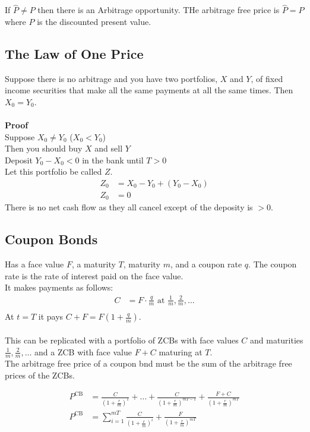 \documentclass[12pt,letterpaper, twocolumn]{article}
\begin{document}
If $\hat{P} \neq P$ then there is an Arbitrage opportunity. THe arbitrage free price is $\hat{P} = P$ where $P$ is the discounted present value. 

\subsection{The Law of One Price}
Suppose there is no arbitrage and you have two portfolios, $X$ and $Y$, of fixed income securities that make all the same payments at all the same times. Then $X_0 = Y_0$.
\\\\\textbf{Proof}\\
Suppose $X_0 \neq Y_0$ ($X_0 < Y_0$)\\
Then you should buy $X$ and sell $Y$\\
Deposit $Y_0 - X_0 <0$ in the bank until $T>0$\\
Let this portfolio be called $Z$. \\
\begin{align*}
    Z_0 &= X_0 - Y_0 + (Y_0 - X_0)\\
    Z_0 &= 0
\end{align*}
There is no net cash flow as they all cancel except of the deposity is $>0$. 

\subsection{Coupon Bonds}
Has a face value $F$, a maturity $T$, maturity $m$, and a coupon rate $q$. The coupon rate is the rate of interest paid on the face value.
\\It makes payments as follows:
\begin{align*}
    C&= F \cdot \frac{q}{m} \text{ at } \frac{1}{m}, \frac{2}{m}, \dots\\
\end{align*}
At $t=T$ it pays $C+F = F(1+\frac{q}{m})$.
\\\\
This can be replicated with a portfolio of ZCBs with face values $C$ and maturities $\frac{1}{m}, \frac{2}{m}, \dots$ and a ZCB with face value $F+C$ maturing at $T$. \\

The arbitrage free price of a coupon bnd must be the sum of the arbitrage free prices of the ZCBs. 

\begin{align*}
    P^{\text{CB}} &= \frac{C}{(1+\frac{r}{m})^1} + \dots + \frac{C}{(1+\frac{r}{m})^{mT-1}} + \frac{F+C}{(1+\frac{r}{m})^{mT}}\\
    P^{\text{CB}} &= \sum_{i=1}^{mT}\frac{C}{(1+\frac{r}{m})^i} + \frac{F}{(1+\frac{r}{m})^{mT}}
\end{align*}
\end{document}

